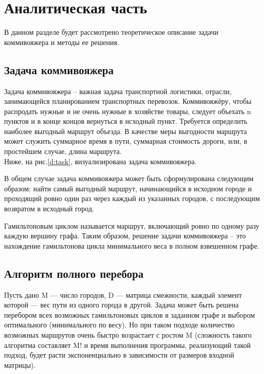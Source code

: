 \chapter{Аналитическая часть}
В данном разделе будет рассмотрено теоретическое описание задачи коммивояжера и методы ее решения.

\section{Задача коммивояжера}

Задача коммивояжера -- важная задача транспортной логистики, отрасли, занимающейся планированием транспортных перевозок. Коммивояжёру, чтобы распродать нужные и не очень нужные в хозяйстве товары, следует объехать n пунктов и в конце концов вернуться в исходный пункт. Требуется определить наиболее выгодный маршрут объезда. В качестве меры выгодности маршрута может служить суммарное время в пути, суммарная стоимость дороги, или, в простейшем случае, длина маршрута.\\


Ниже, на рис.\ref{d:task}, визуализирована задача коммивояжера.


В общем случае задача коммивояжера может быть сформулирована
следующим образом: найти самый выгодный маршрут, начинающийся в исходном городе и проходящий ровно один раз через каждый из указанных городов, с последующим возвратом в исходный город.


Гамильтоновым циклом называется маршрут, включающий ровно по одному разу каждую вершину графа. Таким образом, решение задачи коммивояжера -- это нахождение гамильтонова цикла минимального веса в полном взвешенном графе.

\section{Алгоритм полного перебора}

Пусть дано M — число городов, D — матрица смежности, каждый
элемент которой — вес пути из одного города в другой. Задача может быть решена перебором всех
возможных гамильтоновых циклов в заданном графе и выбором оптимального (минимального по весу). Но при таком подходе количество возможных маршрутов очень быстро возрастает с ростом M (сложность такого алгоритма составляет M! и время выполнения программы, реализующий такой подход, будет расти экспоненциально в зависимости от размеров входной матрицы). 

